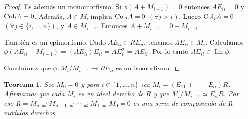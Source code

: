 \documentclass{report}
\newcommand{\Col}{\textnormal{Col}}
\DeclareMathOperator{\image}{\text{Im}}
\newtheorem{theorem}{Teorema}
\begin{document}
\begin{proof}
    Es además un monomorfismo.
    Si \(\phi(A + M_{i - 1}) = 0\) entonces \(A E_{i i} = 0\) y \(\Col_i A = 0\).
    Además, \(A \in M_i\) implica \(\Col_j A = 0\) \((\forall j > i)\).
    Luego \(\Col_j A = 0\) \((\forall j \in \{i, \dots, n\})\), y \(A \in M_{i - 1}\).
    Entonces \(A + M_{i - 1} = 0 + M_{i - 1}\).

    También es un epimorfismo.
    Dado \(A E_{i i} \in R E_{i i}\), tenemos \(A E_{i i} \in M_i\).
    Calculamos \(\phi(A E_{i i} + M_{i - 1})= (A E_{i i}) E_{i i} = A E_{i i}^2 = A E_{i i}\).
    Por lo tanto \(A E_{i i} \in \image \phi\).

    Concluímos que \(\phi : M_i / M_{i - 1} \rightarrow R E_{i i}\) es un isomorfismo.
  \end{proof}

  \begin{theorem}
    \label{theorem:compositionSeriesOfRightModulesForMatrixRing}
    Sea \(M_0 = 0\) y para \(i \in \{1, \dots, n\}\) sea \(M_i = (E_{1 1} + \cdots + E_{i i}) R\).
    Afirmamos que cada \(M_i\) es un ideal derecho de \(R\) y que \(M_i / M_{i - 1} \simeq E_{i i} R\).
    Por eso \(R = M_n \supseteq M_{n - 1} \supseteq \cdots \supseteq M_1 \supseteq M_0 = 0\) es una serie de composición de \(R\)-módulos derechos.
  \end{theorem}
\end{document}
